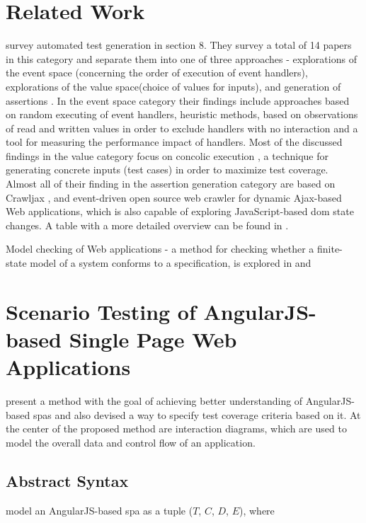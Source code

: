 \section{Related Work}
\textcite{andreasen2017survey} survey automated test generation in section 8\parencite[23-25]{andreasen2017survey}. They survey a total of 14 papers in this category and separate them into one of three approaches - explorations of the event space (concerning the order of execution of event handlers), explorations of the value space(choice of values for inputs), and generation of assertions \parencite{andreasen2017survey}. 
In the event space category their findings include 
approaches based on random executing of event handlers, heuristic methods, based on observations of read and written values in order to exclude handlers with no interaction and a tool for measuring the performance impact of handlers. Most of the discussed findings in the value category focus on concolic execution \parencite{godefroid2005dart}, a technique for generating concrete inputs (test cases) in order to maximize test coverage. Almost all of their finding in the assertion generation category are based on
Crawljax \parencite{crawljax2021Feb}, and event-driven open source web crawler for dynamic Ajax-based Web applications, which is also capable of exploring JavaScript-based \gls{dom} state changes.
A table with a more detailed overview can be found in \parencite[24]{andreasen2017survey}.

Model checking of Web applications - a method for checking whether a finite-state model of a system conforms to a specification, is explored in \parencite{zhang2019scenario} and \parencite{gao2019model}
\section{Scenario Testing of AngularJS-based Single Page Web Applications}
\textcite{zhang2019scenario} present a method with the goal of achieving better understanding of AngularJS-based \glspl{spa} and also devised a way to specify test coverage criteria based on it. At the center of the proposed method are interaction diagrams, which are used to model the overall data and control flow of an application.\parencite{zhang2019scenario}

\subsection{Abstract Syntax}
\textcite{zhang2019scenario} model an AngularJS-based \gls{spa} as a tuple ($T$, $C$, $D$, $E$), where

